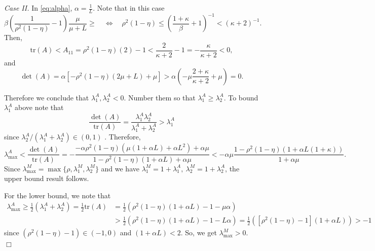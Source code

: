 \documentclass[11pt]{article}
\begin{document}
\textit{Case II.} In \eqref{eq:alpha}, $\alpha = \frac{1}{L}$.  Note that in this case
\begin{equation}\label{eq:step}
  \beta\left(\frac{1}{\rho^2(1-\eta)}-1\right)\frac{\mu}{\mu+L} \geq  \quad \Leftrightarrow \quad \rho^2(1-\eta) \leq \left(\frac{1+\kappa}{\beta} + 1\right)^{-1} < \left(\kappa + 2 \right)^{-1}.
\end{equation}
Then,
\[
 \mbox{tr}(A) < A_{11} = \rho^2(1-\eta)(2)-1 < \frac{2}{\kappa + 2} -1 = -\frac{\kappa}{\kappa + 2}<0,
\]
and
\[
 \det(A) = \alpha[-\rho^2(1-\eta)(2\mu+ L)+\mu] > \alpha\left(-\mu\frac{2+\kappa}{\kappa + 2} + \mu\right) = 0.
\]

\bigskip

Therefore we conclude that $\lambda^A_1,\lambda^A_2<0$. 
Number them so that $\lambda^A_1 \geq \lambda^A_2$.
To bound  $\lambda^A_1$ above note that
\[
	\frac{\det(A)}{\mbox{tr}(A)} =\frac{ \lambda^A_1 \lambda^A_2} {\lambda^A_1 + \lambda^A_2} > \lambda^A_1
\]	
since $ \lambda^A_2 /  ( \lambda^A_1 + \lambda^A_2 ) \in (0,1)$ .
%
Therefore,
\begin{equation}\label{eq:lambdaA}
 \lambda_{\max}^A < \frac{\det(A)}{\mbox{tr}(A)} = -\frac{-\alpha\rho^2(1-\eta)(\mu(1+\alpha L)+\alpha L^2)+\alpha\mu}{1-\rho^2(1-\eta)(1+\alpha  L)+\alpha\mu} < -\alpha\mu\frac{1-\rho^2(1-\eta)(1+\alpha L(1+\kappa))}{1+\alpha\mu}. 
\end{equation}
Since $\lambda^M_{\max} = \max\{\rho,\lambda^M_1,\lambda^M_2\}$ and we have $\lambda^M_1=1+\lambda^A_1,\ \lambda^M_2=1+\lambda^A_2$, the upper bound result follows.  

\bigskip

For the lower bound, we note that 
\begin{align*}
 \lambda^A_{\max} \geq \frac{1}{2}(\lambda^A_1 + \lambda^A_2) = \frac{1}{2}\mbox{tr}(A) &= \frac{1}{2}(\rho^2(1-\eta)(1+\alpha  L)-1-\mu\alpha)\\
 &>\frac{1}{2}(\rho^2(1-\eta)(1+\alpha  L)-1-L\alpha) = \frac{1}{2}([\rho^2(1-\eta)-1](1+\alpha  L))>-1
\end{align*}
since $(\rho^2(1-\eta)-1)\in(-1,0)$ and $(1+\alpha L)<2$.  So, we get $\lambda_{\max}^M>0$.
\hspace*{\fill}$\Box$\medskip
\end{document}
